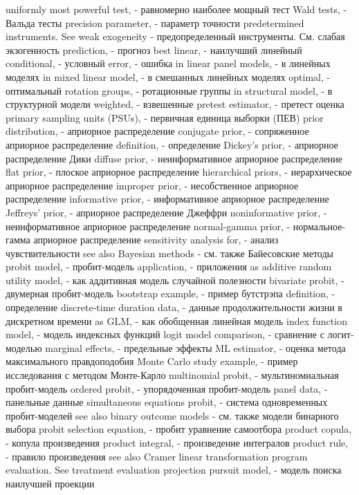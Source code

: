 uniformly most powerful test, - равномерно наиболее мощный тест
Wald tests, - Вальда тесты
precision parameter, - параметр точности
predetermined instruments. See weak exogeneity - предопределенный инструменты. См. слабая экзогенность
prediction, - прогноз
best linear, - наилучший линейный
conditional, - условный
error, - ошибка
in linear panel models, - в линейных моделях
in mixed linear model, - в смешанных линейных моделях
optimal, - оптимальный
rotation groups, - ротационные группы
in structural model, - в структурной модели
weighted, - взвешенные
pretest estimator, - претест оценка
primary sampling units (PSUs), - первичная единица выборки (ПЕВ)
prior distribution, - априорное распределение
conjugate prior, - сопряженное априорное распределение
definition, - определение
Dickey’s prior, - априорное распределение Дики
diffuse prior, - неинформативное априорное распределение
flat prior, - плоское априорное распределение
hierarchical priors, - иерархическое априорное распределение
improper prior, - несобственное априорное распределение
informative prior, - информативное априорное распределение
Jeffreys’ prior, - априорное распределение Джеффри
noninformative prior, - неинформативное априорное распределение
normal-gamma prior, - нормальное-гамма априорное распределение
sensitivity analysis for, - анализ чувствительности
see also Bayesian methods - см. также Байесовские методы
probit model, - пробит-модель
application, - приложения
as additive random utility model, - как аддитивная модель случайной полезности
bivariate probit, - двумерная пробит-модель
bootstrap example, - пример бутстрэпа
definition, - определение
discrete-time duration data, - данные продолжительности жизни в дискретном времени
as GLM, - как обобщенная линейная модель
index function model, - модель индексных функций
logit model comparison, - сравнение с логит-моделью
marginal effects, - предельные эффекты
ML estimator, - оценка метода максимального правдоподобия
Monte Carlo study example, - пример исследования с методом Монте-Карло
multinomial probit, - мультиномиальная пробит-модель
ordered probit, - упорядоченная пробит-модель
panel data, - панельные данные
simultaneous equations probit, - система одновременных пробит-моделей
see also binary outcome models - см. также модели бинарного выбора
probit selection equation, - пробит уравнение самоотбора
product copula, - копула произведения
product integral, - произведение интегралов
product rule, - правило произведения
see also Cramer linear transformation program evaluation. See treatment evaluation projection pursuit model, - модель поиска наилучшей проекции
